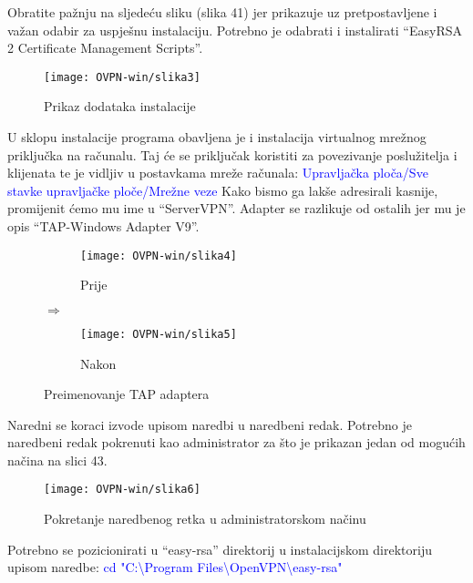 Obratite pažnju na sljedeću sliku (slika 41) jer prikazuje uz pretpostavljene i važan odabir za uspješnu instalaciju. Potrebno je odabrati i instalirati ``EasyRSA 2 Certificate Management Scripts''.
\begin{figure}[h!]
	\centering
     \texttt{[image: OVPN-win/slika3]}
     \caption{Prikaz dodataka instalacije}
\end{figure}
\FloatBarrier
U sklopu instalacije programa obavljena je i instalacija virtualnog mrežnog priključka na računalu. Taj će se priključak koristiti za povezivanje poslužitelja i klijenata te je vidljiv u postavkama mreže računala:\smallbreak
\small\textcolor{blue}{Upravljačka ploča/Sve stavke upravljačke ploče/Mrežne veze}
\smallbreak
Kako bismo ga lakše adresirali kasnije, promijenit ćemo mu ime u ``ServerVPN''. Adapter se razlikuje od ostalih jer mu je opis ``TAP-Windows Adapter V9''.

\begin{figure}[h!]
    \centering
    \begin{subfigure}[b]{0.35\textwidth}
        \texttt{[image: OVPN-win/slika4]}
        \caption{Prije}
        \label{fig:prije}
    \end{subfigure}
    $\Longrightarrow$
    \begin{subfigure}[b]{0.35\textwidth}
        \texttt{[image: OVPN-win/slika5]}
        \caption{Nakon}
        \label{fig:nakon}
    \end{subfigure}
    \caption{Preimenovanje TAP adaptera}
\end{figure}
\FloatBarrier

Naredni se koraci izvode upisom naredbi u naredbeni redak. Potrebno je naredbeni redak pokrenuti kao administrator za što je prikazan jedan od mogućih načina na slici 43.

\begin{figure}[h!]
	\centering
     \texttt{[image: OVPN-win/slika6]}
     \caption{Pokretanje naredbenog retka u administratorskom načinu}
\end{figure}
\FloatBarrier

Potrebno se pozicionirati u ``easy-rsa'' direktorij u instalacijskom direktoriju upisom naredbe:\smallbreak
\small\textcolor{blue}{cd "C:\textbackslash Program Files\textbackslash OpenVPN\textbackslash easy-rsa"}
\smallbreak

